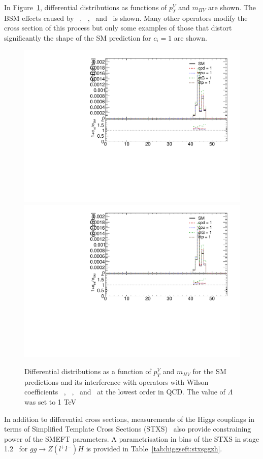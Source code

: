 In Figure~\ref{fig:higgseft:ggzh}, differential distributions as functions of $p_{T}^{V}$ and $m_{HV}$ are shown. The BSM effects caused by \cpqi\ , \cpu\ , \ctG\ and \ctp\ is shown.  Many other operators modify the cross section of this process but only some examples of those that distort significantly the shape of the SM prediction for  $c_i=1$ are shown.

\begin{figure}
\includegraphics[width=0.49\linewidth,page=7]{figures/kinematics_ggHll_np0.pdf}
\includegraphics[width=0.49\linewidth,page=10]{figures/kinematics_ggHll_np0.pdf}
\label{fig:higgseft:ggzh}
\caption{Differential distributions as a function of $p_{T}^{V}$ and $m_{HV}$ for the SM predictions and its interference with operators with Wilson coefficients \ctG\ , \cpd\ , \cpu\ and \ctp\  at the lowest order in QCD. The value of $\Lambda$ was set to 1 TeV}  
\end{figure}

In addition to differential cross sections, measurements  of the Higgs couplings in terms of Simplified Template Cross Sections (STXS)~\cite{deFlorian:2016spz} also provide constraining power of the SMEFT parameters. A parametrisation in bins of the STXS in stage 1.2~\cite{Berger:2019wnu}  for $gg\to Z(l^{+}l^{-})H$  is provided in Table~\ref{tab:higgseft:stxsggzh}.


